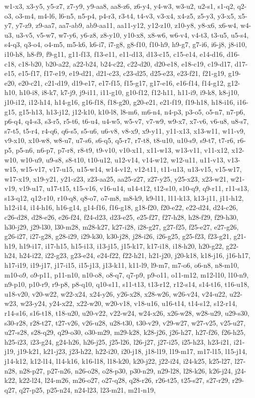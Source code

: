 w1-x3, x3-y5, y5-z7, z7-y9, y9-aa8, aa8-z6, z6-y4, y4-w3, w3-u2, u2-s1, s1-q2, q2-o3, o3-m4, m4-l6, l6-n5, n5-p4, p4-r3, r3-t4, t4-v3, v3-x4, x4-z5, z5-y3, y3-x5, x5-y7, y7-z9, z9-aa7, aa7-ab9, ab9-aa11, aa11-y12, y12-z10, z10-y8, y8-x6, x6-w4, w4-u3, u3-v5, v5-w7, w7-y6, y6-z8, z8-y10, y10-x8, x8-w6, w6-v4, v4-t3, t3-u5, u5-s4, s4-q3, q3-o4, o4-m5, m5-k6, k6-i7, i7-g8, g8-f10, f10-h9, h9-g7, g7-i6, i6-j8, j8-i10, i10-h8, h8-f9, f9-g11, g11-f13, f13-e11, e11-d13, d13-c15, c15-e14, e14-d16, d16-c18, c18-b20, b20-a22, a22-b24, b24-c22, c22-d20, d20-e18, e18-c19, c19-d17, d17-e15, e15-f17, f17-e19, e19-d21, d21-c23, c23-d25, d25-e23, e23-f21, f21-g19, g19-e20, e20-c21, c21-d19, d19-e17, e17-f15, f15-g17, g17-e16, e16-f14, f14-g12, g12-h10, h10-i8, i8-k7, k7-j9, j9-i11, i11-g10, g10-f12, f12-h11, h11-i9, i9-k8, k8-j10, j10-i12, i12-h14, h14-g16, g16-f18, f18-g20, g20-e21, e21-f19, f19-h18, h18-i16, i16-g15, g15-h13, h13-j12, j12-k10, k10-l8, l8-m6, m6-n4, n4-p3, p3-o5, o5-n7, n7-p6, p6-q4, q4-s3, s3-r5, r5-t6, t6-u4, u4-w5, w5-v7, v7-w9, w9-x7, x7-v6, v6-u8, u8-s7, s7-t5, t5-r4, r4-q6, q6-s5, s5-u6, u6-v8, v8-x9, x9-y11, y11-x13, x13-w11, w11-v9, v9-x10, x10-w8, w8-u7, u7-s6, s6-q5, q5-r7, r7-t8, t8-u10, u10-s9, s9-t7, t7-r6, r6-p5, p5-n6, n6-p7, p7-r8, r8-t9, t9-v10, v10-x11, x11-w13, w13-v11, v11-x12, x12-w10, w10-u9, u9-s8, s8-t10, t10-u12, u12-v14, v14-w12, w12-u11, u11-v13, v13-w15, w15-v17, v17-u15, u15-w14, w14-v12, v12-t11, t11-u13, u13-v15, v15-w17, w17-x19, x19-y21, y21-z23, z23-aa25, aa25-z27, z27-y25, y25-x23, x23-w21, w21-v19, v19-u17, u17-t15, t15-v16, v16-u14, u14-t12, t12-s10, s10-q9, q9-r11, r11-s13, s13-q12, q12-r10, r10-q8, q8-o7, o7-m8, m8-k9, k9-l11, l11-k13, k13-j11, j11-h12, h12-i14, i14-h16, h16-g14, g14-f16, f16-g18, g18-f20, f20-e22, e22-d24, d24-c26, c26-d28, d28-e26, e26-f24, f24-d23, d23-e25, e25-f27, f27-h28, h28-f29, f29-h30, h30-j29, j29-l30, l30-m28, m28-k27, k27-i28, i28-g27, g27-f25, f25-e27, e27-g26, g26-i27, i27-g28, g28-i29, i29-k30, k30-j28, j28-i26, i26-g25, g25-f23, f23-g21, g21-h19, h19-i17, i17-h15, h15-i13, i13-j15, j15-k17, k17-i18, i18-h20, h20-g22, g22-h24, h24-i22, i22-g23, g23-e24, e24-f22, f22-h21, h21-j20, j20-k18, k18-j16, j16-h17, h17-i19, i19-j17, j17-i15, i15-j13, j13-k11, k11-l9, l9-m7, m7-o6, o6-n8, n8-m10, m10-o9, o9-p11, p11-n10, n10-o8, o8-q7, q7-p9, p9-o11, o11-m12, m12-l10, l10-n9, n9-p10, p10-r9, r9-p8, p8-q10, q10-s11, s11-t13, t13-r12, r12-s14, s14-t16, t16-u18, u18-v20, v20-w22, w22-x24, x24-y26, y26-x28, x28-w26, w26-v24, v24-u22, u22-w23, w23-y24, y24-x22, x22-w20, w20-v18, v18-u16, u16-t14, t14-s12, s12-r14, r14-s16, s16-t18, t18-u20, u20-v22, v22-w24, w24-x26, x26-w28, w28-u29, u29-s30, s30-r28, r28-t27, t27-v26, v26-u28, u28-t30, t30-v29, v29-w27, w27-v25, v25-u27, u27-s28, s28-q29, q29-o30, o30-m29, m29-k28, k28-j26, j26-h27, h27-f26, f26-h25, h25-i23, i23-g24, g24-h26, h26-j25, j25-l26, l26-j27, j27-i25, i25-h23, h23-i21, i21-j19, j19-k21, k21-j23, j23-h22, h22-i20, i20-j18, j18-l19, l19-m17, m17-l15, l15-j14, j14-k12, k12-l14, l14-k16, k16-l18, l18-k20, k20-j22, j22-i24, i24-k25, k25-l27, l27-n28, n28-p27, p27-n26, n26-o28, o28-p30, p30-n29, n29-l28, l28-k26, k26-j24, j24-k22, k22-l24, l24-m26, m26-o27, o27-q28, q28-r26, r26-t25, t25-s27, s27-r29, r29-q27, q27-p25, p25-n24, n24-l23, l23-m21, m21-n19, 